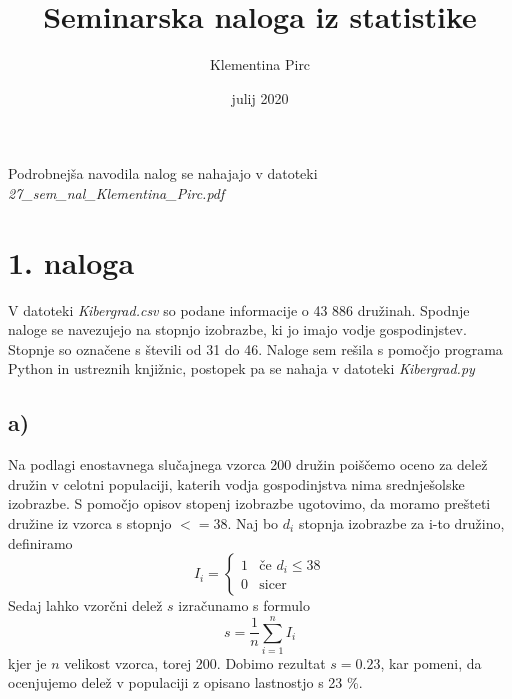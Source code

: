 \documentclass[A4paper, 11pt]{article}
\title{Seminarska naloga iz statistike}
\author{Klementina Pirc}
\affil{Fakulteta za matematiko in fiziko \\ Oddelek za matematiko}
\date{julij 2020}
\begin{document}
\begin{titlepage} 

\maketitle
\thispagestyle{empty}
	
\end{titlepage}

\noindent
Podrobnejša navodila nalog se nahajajo v datoteki \textit{27\_sem\_nal\_Klementina\_Pirc.pdf}


\section*{1. naloga}

V datoteki \textit{Kibergrad.csv} so podane informacije o 43 886 družinah. Spodnje naloge se navezujejo na stopnjo izobrazbe, ki jo imajo vodje gospodinjstev. Stopnje so označene s števili od 31 do 46. Naloge sem rešila s pomočjo programa Python in ustreznih knjižnic, postopek pa se nahaja v datoteki \textit{Kibergrad.py}

\subsection*{a)}
Na podlagi enostavnega slučajnega vzorca 200 družin poiščemo oceno za delež družin v celotni populaciji, katerih vodja gospodinjstva nima srednješolske izobrazbe. S pomočjo opisov stopenj izobrazbe ugotovimo, da moramo prešteti družine iz vzorca s stopnjo $<= 38$. Naj bo $d_i$ stopnja izobrazbe za i-to družino, definiramo 
\[I_i = \left \{
	\begin{array}{ll}
		1  & \mbox{če } d_i \leq 38 \\
		0 & \mbox{sicer}
	\end{array}
	\right.
\]
Sedaj lahko vzorčni delež $s$ izračunamo s formulo
\[ s = \frac{1}{n} \sum_{i=1}^{n} I_i \]
kjer je $n$ velikost vzorca, torej 200. Dobimo rezultat $s = 0.23$, kar pomeni, da ocenjujemo delež v populaciji z opisano lastnostjo s 23 \%.
\end{document}

